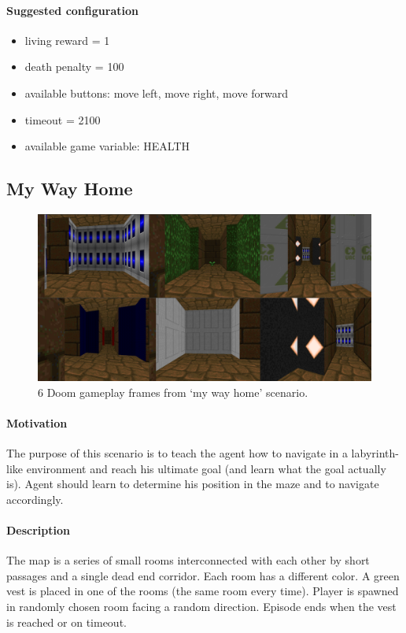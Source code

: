\documentclass[english,bachelor,a4paper,twoside]{ppfcmthesis}
\begin{document}
		\paragraph{Suggested configuration}
		\begin{itemize}
			\item living reward = 1
			\item death penalty = 100
			\item available buttons: move left, move right, move forward
			\item timeout = 2100
			\item available game variable: HEALTH
		\end{itemize}
	\newpage

	\subsection{My Way Home}
		\begin{figure}
			\centering
			\includegraphics[scale=0.22]{my_way_home.png}
			\caption{6 Doom gameplay frames from `my way home' scenario.}\label{fig:my_way_home}
		\end{figure}
		\paragraph{Motivation} 
			The purpose of this scenario is to teach the agent how to navigate in a labyrinth-like environment and reach his ultimate goal (and learn what the goal actually is). Agent should learn to determine his position in the maze and to navigate accordingly.

		\paragraph{Description}
			The map is a series of small rooms interconnected with each other by short passages and a single dead end corridor. Each room has a different color. A green vest is placed in one of the rooms (the same room every time). Player is spawned in randomly chosen room facing a random direction. Episode ends when the vest is reached or on timeout.
\end{document}
